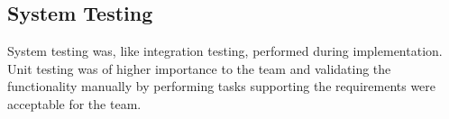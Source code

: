 \subsection{System Testing}
System testing was, like integration testing, performed during implementation. Unit testing was of higher importance to the team and validating the functionality manually by performing tasks supporting the requirements were acceptable for the team.
